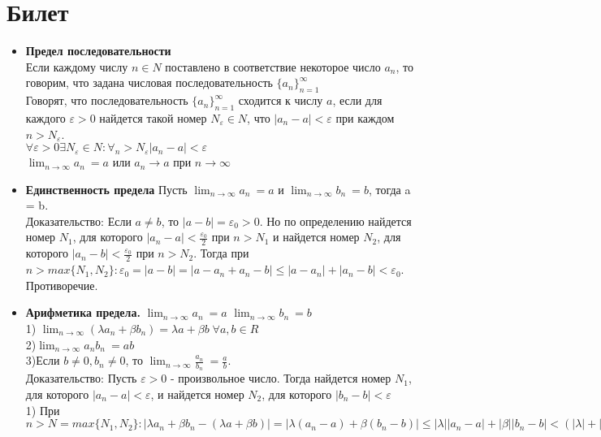 \documentclass[12pt,a4paper]{article}
\begin{document}
\section{Билет}
\begin{itemize}
    \item \textbf{Предел последовательности} \\
    Если каждому числу $n \in N$ поставлено в соответствие некоторое число $a_n$, то говорим, что задана числовая последовательность $\{a_n\}_{n=1}^{\infty}$ \\
    Говорят, что последовательность $\{a_n\}_{n=1}^{\infty}$ сходится к числу $a$, если для каждого $\varepsilon > 0$ найдется такой номер $N_{\varepsilon} \in N$, что $|a_n - a| < \varepsilon$ при каждом $n > N_{\varepsilon}$. \\
    $\forall \varepsilon > 0  \exists N_{\varepsilon} \in N : \forall_n> N_{\varepsilon} |a_n - a| < \varepsilon$ \\
    $ \lim_{n\to\infty} a_n \ = a$  или $a_n \to a$ при $n \to \infty$
    \item \textbf{Единственность предела}
    Пусть  $\lim_{n \to \infty} a_n\ = a$ и $\lim_{n \to \infty} b_n\ = b$, тогда a = b. \\
    Доказательство: Если $a \neq b$, то $|a - b| = \varepsilon_0 > 0$. Но по определению найдется номер $N_1$, для которого $|a_n - a| < \frac{\varepsilon_0}{2}$ при $n > N_1$ и найдется номер $N_2$, для которого $|a_n - b| < \frac{\varepsilon_0}{2}$ при $n > N_2$. Тогда при $n > max \{N_1, N_2\} : \varepsilon_0 = |a - b| = |a - a_n + a_n - b| \leq |a - a_n| + |a_n - b| < \varepsilon_0$. Противоречие.
    \item \textbf{Арифметика предела.}
    $\lim_{n \to \infty} a_n\ = a$  $\lim_{n \to \infty} b_n\ = b$\\
    1) $ \lim_{n \to \infty} (\lambda a_n + \beta b_n) = \lambda a + \beta b \;  \forall a, b \in R $ \\
    2)$\lim_{n \to \infty} a_n b_n\ = ab$\\
    3)Если $b \neq 0, b_n \neq 0$, то $\lim_{n \to \infty} \frac{a_n}{b_n}\ = \frac{a}{b}$. \\
    Доказательство: Пусть $\varepsilon > 0$ - произвольное число. Тогда найдется номер $N_1$, для которого $|a_n - a| < \varepsilon$, и найдется номер $N_2$, для которого $|b_n - b| < \varepsilon$\\
    1) При $n > N = max\{ N_1, N_2 \} : |\lambda a_n + \beta b_n - (\lambda a + \beta b)| = |\lambda(a_n - a) + \beta(b_n - b)| \leq |\lambda| |a_n - a| + |\beta| |b_n - b| < (|\lambda| + |\beta|)\varepsilon$ \\

\end{itemize}
\end{document}
